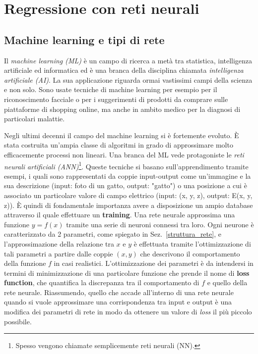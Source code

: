 \documentclass[12pt,a4paper,final]{book}
\begin{document}



\chapter{Regressione con reti neurali}\label{reg_nn}


\section{Machine learning e tipi di rete}
Il \textit{machine learning (ML)} è un campo di ricerca a metà tra statistica, intelligenza artificiale ed informatica ed è una branca della disciplina chiamata \textit{intelligenza artificiale (AI)}. La sua applicazione riguarda ormai vastissimi campi della scienza e non solo. Sono usate tecniche di machine learning per esempio per il riconoscimento facciale o per i suggerimenti di prodotti da comprare sulle piattaforme di shopping online, ma anche in ambito medico per la diagnosi di particolari malattie.


Negli ultimi decenni il campo del machine learning si è fortemente evoluto. È stata costruita un'ampia classe di algoritmi in grado di approssimare molto efficacemente processi non lineari. Una branca del ML vede protagoniste le \textit{reti neurali artificiali (ANN)}\footnote{Spesso vengono chiamate semplicemente reti neurali (NN).}.
Queste tecniche si basano sull'apprendimento tramite esempi, i quali sono rappresentati da coppie input-output come un'immagine e la sua descrizione (input: foto di un gatto, output: "gatto") o una posizione a cui è associato un particolare valore di campo elettrico (input: (x, y, z), output: E(x, y, z)). È quindi di fondamentale importanza avere a disposizione un ampio database attraverso il quale effettuare un \textbf{training}.
Una rete neurale approssima una funzione $y=f(x)$ tramite una serie di neuroni connessi tra loro. Ogni neurone è caratterizzato da 2 parametri, come spiegato in Sez.~\ref{struttura_rete}, e l'approssimazione della relazione tra $x$ e $y$ è effettuata tramite l'ottimizzazione di tali parametri a partire dalle coppie $(x, y)$ che descrivono il comportamento della funzione $f$ in casi realistici. L'ottimizzazione dei parametri è da intendersi in termini di minimizzazione di una particolare funzione che prende il nome di \textbf{loss function}, che quantifica la discrepanza tra il comportamento di $f$ e quello della rete neurale. Riassumendo, quello che accade all'interno di una rete neurale quando si vuole approssimare una corrispondenza tra input e output è una modifica dei parametri di rete in modo da ottenere un valore di \textit{loss} il più piccolo possibile. 
\end{document}
